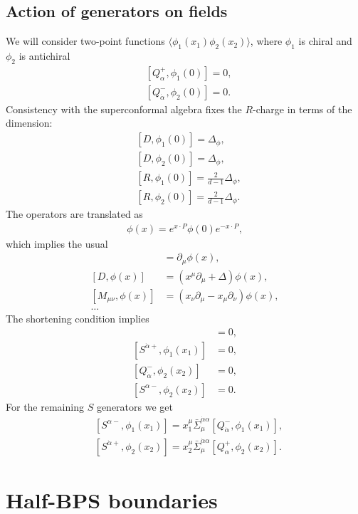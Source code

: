 \documentclass[letterpaper]{article}
\let\Oldsection\section
\renewcommand{\section}{\FloatBarrier\Oldsection}
\let\Oldsubsection\subsection
\renewcommand{\subsection}{\FloatBarrier\Oldsubsection}
\def\a{{\alpha}}
\def\ad{{\dot{\alpha}}}
\begin{document}
\subsection{Action of generators on fields}

We will consider two-point functions $\langle \phi_1(x_1) \phi_2(x_2) \rangle$, where $\phi_1$ is chiral and $\phi_2$ is antichiral
\begin{align}
 & [Q^+_\a,  \phi_1(0)] = 0, \\
 & [Q^-_\ad, \phi_2(0)] = 0.
\end{align}
Consistency with the superconformal algebra fixes the $R$-charge in terms of the dimension:
\begin{align}
 & [D, \phi_1(0)] = \Delta_\phi, \\
 & [D, \phi_2(0)] = \Delta_\phi, \\
 & [R, \phi_1(0)] = \frac{2}{d-1} \Delta_\phi, \\
 & [R, \phi_2(0)] = \frac{2}{d-1} \Delta_\phi.
\end{align}
The operators are translated as
\begin{align}
 \phi(x) = e^{x\cdot P} \phi(0) e^{-x\cdot P},
\end{align}
which implies the usual
\begin{align}
 [P_\mu, \phi(x)] & = \partial_\mu \phi(x), \\
 [D, \phi(x)] & =  (x^\mu \partial_\mu + \Delta) \phi(x), \\
 [M_{\mu\nu}, \phi(x)] & =  (x_\nu \partial_\mu - x_\mu \partial_\nu) \phi(x), \\
 \ldots
\end{align}
The shortening condition implies
\begin{align}
 [Q^+_\a,   \phi_1(x_1)] & = 0, \\
 [S^{\ad+}, \phi_1(x_1)] & = 0, \\
 [Q^-_\ad,  \phi_2(x_2)] & = 0, \\
 [S^{\a-},  \phi_2(x_2)] & = 0.
\end{align}
For the remaining $S$ generators we get
\begin{align}
 & [S^{\a-}, \phi_1(x_1)]
 = x_1^\mu \bar \Sigma_\mu^{\ad\a} [Q^-_\ad, \phi_1(x_1)], \\
 & [S^{\ad+}, \phi_2(x_2)]
 = x_2^\mu \bar \Sigma_\mu^{\ad\a} [Q^+_\a,  \phi_2(x_2)].
\end{align}

\section{Half-BPS boundaries}
\end{document}
